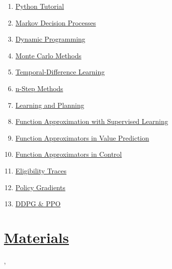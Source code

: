 \documentclass[11pt]{article}
\renewcommand{\today}{\shortmonthname[\the\month] \the \day,  \the\year}
\begin{document}
\vspace{-0.5cm}

\begin{enumerate}
	\item  \href{https://mp.weixin.qq.com/s/xMOtJyXxqcM88O-Hmsqatw}{Python Tutorial} %
	\item  \href{https://mp.weixin.qq.com/s/ty-z6ZEWpPNsnv_-AwYa3A}{Markov Decision Processes} %
	\item  \href{https://mp.weixin.qq.com/s/1a5NRG9rnFMEVzhf0-SqVw}{Dynamic Programming} %
	\item  \href{https://mp.weixin.qq.com/s/CRti-ca2b-YfIixfLW5s3A}{Monte Carlo Methods} %
	\item  \href{https://mp.weixin.qq.com/s/2Z_bHYL5v1CffKDYGikY5w}{Temporal-Difference Learning} %
	\item  \href{https://mp.weixin.qq.com/s/Y0Ua4KnNzVMRBu4qQ3eVnA}{n-Step Methods} %
	\item  \href{https://mp.weixin.qq.com/s/VTi4p-zC-flgR4E2sIhtvA}{Learning and Planning} %
	\item  \href{https://mp.weixin.qq.com/s/G2HXePIKoS0KBIjEMkhRbg}{Function Approximation with Supervised Learning} %
	\item  \href{https://mp.weixin.qq.com/s/bZ0QjlVKmMlNowGZt5SIVg}{Function Approximators in Value Prediction} %
	\item  \href{https://mp.weixin.qq.com/s/NKVcpsa9F_RGz1EqRgb6TQ}{Function Approximators in Control} %
	\item  \href{https://mp.weixin.qq.com/s/PlG2_3ewLE_j2PdKBMfI7w}{Eligibility Traces} %
	\item  \href{https://mp.weixin.qq.com/s/h0N35C0z1Rj7vrtVWN5DEg}{Policy Gradients} %
	\item  \href{https://mp.weixin.qq.com/s/Cn69hOhE8A5O7wnB2UQeIw}{DDPG \& PPO} %
\end{enumerate}

\vspace{-1cm}

\section{\href{ https://pan.baidu.com/s/1NUvtBgtSdKTNt8-qlw4M4w}{Materials}}



%
\begin{flushright}
	\tiny \today 
\end{flushright}
\end{document}
